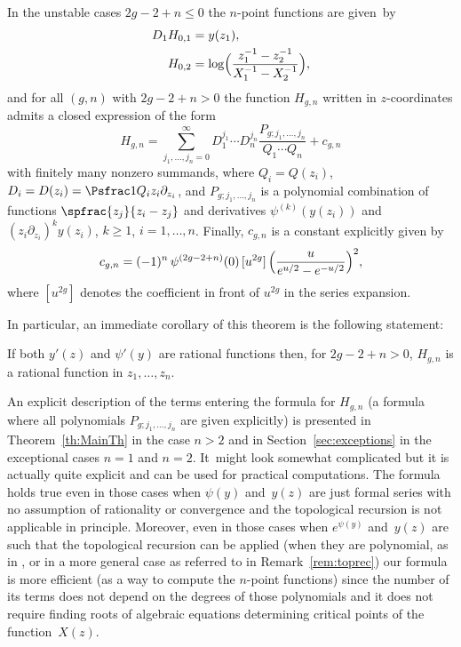 \begin{theorem}\label{th:intro}
In the unstable cases $2g-2+n\le0$ the $n$-point functions are given~by
\begin{align}
D_1 H_{0,1}&=y(z_1), \notag%
\\
H_{0,2}&=\log\Bigl(\frac{z_1^{-1}-z_2^{-1}}{X_1^{-1}-X_2^{-1}}\Bigr),\label{eq:H02}
\end{align}
and for all $(g,n)$ with $2g-2+n>0$ the function $H_{g,n}$ written in $z$-coordinates admits a closed expression of the form
\begin{equation}\label{eqTh1}
H_{g,n}=\sum_{j_1,\dots,j_n = 0}^\infty D_1^{j_1}\cdots D_n^{j_n}
\frac{P_{g;j_1,\dots,j_n}}{Q_1\cdots Q_n}+c_{g,n}
\end{equation}
with finitely many nonzero summands, where $Q_i=Q(z_i)$, $D_i=D(z_i)=\Psfrac1{Q_i}z_i\partial_{z_i}$, and $P_{g;j_1,\dots,j_n}$ is a polynomial combination of functions
$\spfrac{z_j}{z_i-z_j}$ and
derivatives $\psi^{(k)}(y(z_i))$ and
$\left(z_i\partial_{z_i}\right)^ky(z_i)$, $k\ge1$, $i=1,\dots, n$.
Finally, $c_{g,n}$ is a constant explicitly given by
\begin{equation*}
c_{g,n}=(-1)^n\,\psi^{(2g-2+n)}(0)\,[u^{2g}]\,\Bigl(\frac{u}{e^{u/2}-e^{-u/2}}\Bigr)^2,
\end{equation*}
where $[u^{2g}]$ denotes the coefficient in front of $u^{2g}$ in the series expansion.
\end{theorem}

In particular, an immediate corollary of this theorem is the following statement:

\begin{corollary}\mbox{}\hspace*{-2mm}
If both $y'(z)$ and $\psi'(y)$ are rational functions then, for \hbox{$2g\!-\!2\!+\!n\!>\!0$}, $H_{g,n}$ is a rational function in $z_1,\dots,z_n$.
\end{corollary}

An explicit description of the terms entering the formula for $H_{g,n}$ (\ie a formula where all polynomials $P_{g;j_1,\dots,j_n}$ are given explicitly) is presented in Theorem~\ref{th:MainTh} in the case $n>2$ and in Section~\ref{sec:exceptions} in the exceptional cases $n=1$ and $n=2$. It~might look somewhat complicated but it is actually quite explicit and can be used for practical computations. The formula holds true even in those cases when $\psi(y)$ and~$y(z)$ are just formal series with no assumption of rationality or convergence and the topological recursion is not applicable in principle. Moreover, even in those cases when $e^{\psi(y)}$ and~$y(z)$ are such that
the topological recursion can be applied (\eg when they are polynomial, as in \cite{ACEH-1,ACEH-2}, or in a more general case as referred to in Remark~\ref{rem:toprec}) our formula is more efficient (as a way to compute the $n$-point functions) since the number of its terms does not depend on the degrees of those polynomials and it does not require finding roots of algebraic equations determining critical points of the function~$X(z)$.


